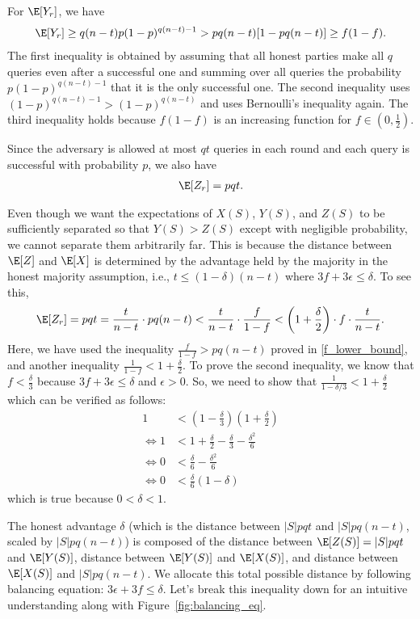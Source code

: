 For $\E[Y_r]$, we have
\begin{align}
\label{eq:y_lower_bound}
    \E[Y_r]  \geq q(n-t)p (1-p)^{q(n-t)-1} > pq(n-t)[1-pq(n-t)] \geq f (1-f).
\end{align}
The first inequality is obtained by assuming that all honest parties make all $q$ queries even after a successful one and summing over all queries the probability $p(1-p)^{q(n-t)-1}$ that it is the only successful one.
The second inequality uses $(1-p)^{q(n-t)-1} > (1-p)^{q(n-t)}$ and uses Bernoulli's inequality again.
The third inequality holds because $f(1-f)$ is an increasing function for $f \in (0,\frac12)$.

Since the adversary is allowed at most $qt$ queries in each round and each query is successful with probability $p$, we also have
\begin{align}
    \E[Z_r] = pqt.
\end{align}

Even though we want the expectations of $X(S)$, $Y(S)$, and $Z(S)$ to be sufficiently separated so that $Y(S) > Z(S)$ except with negligible probability, we cannot separate them arbitrarily far. This is because the distance between $\E[Z]$ and $\E[X]$ is determined by the advantage held by the majority in the honest majority assumption, i.e., $t \leq (1-\delta)(n-t)$ where $3f+3\epsilon \leq \delta$.
To see this,
\begin{align}
    \E[Z_r] = pqt = \frac{t}{n-t} \cdot pq(n-t) < \frac{t}{n-t} \cdot \frac{f}{1-f} < \left(1+\frac{\delta}{2}\right)\cdot f \cdot \frac{t}{n-t}.
\end{align}
Here, we have used the inequality $\frac{f}{1-f} > pq(n-t)$ proved in \eqref{f_lower_bound}, and another inequality $\frac{1}{1-f} < 1 + \frac{\delta}{2}$. To prove the second inequality, we know that $f < \frac{\delta}{3}$ because $3f+3\epsilon \leq \delta$ and $\epsilon>0$. So, we need to show that $\frac{1}{1-\delta/3} < 1+\frac{\delta}{2}$ which can be verified as follows:
\begin{align*}
    1 &< \left(1-\frac{\delta}{3}\right) \left(1+\frac{\delta}{2}\right) \\
    \iff 1 &< 1 + \frac{\delta}{2} - \frac{\delta}{3} - \frac{\delta^2}{6} \\
    \iff 0 &< \frac{\delta}{6} - \frac{\delta^2}{6} \\
    \iff 0 &< \frac{\delta}{6}(1-\delta)
\end{align*}
which is true because $0 < \delta < 1$.

The honest advantage $\delta$ (which is the distance between $|S|pqt$ and $|S|pq(n-t)$, scaled by $|S|pq(n-t)$) is composed of the distance between $\E[Z(S)]=|S|pqt$ and $\E[Y(S)]$, distance between $\E[Y(S)]$ and $\E[X(S)]$, and distance between $\E[X(S)]$ and $|S|pq(n-t)$. We allocate this total possible distance by following balancing equation: $3\epsilon + 3f \leq \delta$. Let's break this inequality down for an intuitive understanding along with Figure~\ref{fig:balancing_eq}.

